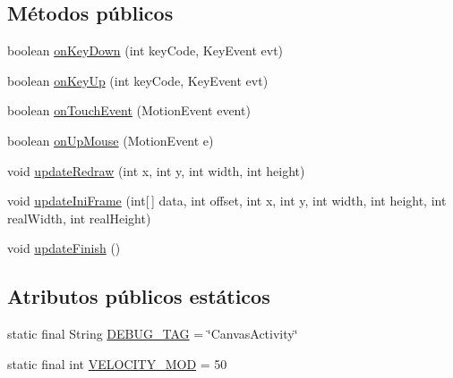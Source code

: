 \subsection*{Métodos públicos}
\begin{DoxyCompactItemize}
\item 
boolean \hyperlink{classes_1_1ucm_1_1tfg_1_1controlremotolinux_1_1client_1_1controller_1_1CanvasActivity_a16ecf145718bb0bcaf12974329d1170e}{on\-Key\-Down} (int key\-Code, Key\-Event evt)
\item 
boolean \hyperlink{classes_1_1ucm_1_1tfg_1_1controlremotolinux_1_1client_1_1controller_1_1CanvasActivity_a48d761e87c01fb342d7955d6a419b17a}{on\-Key\-Up} (int key\-Code, Key\-Event evt)
\item 
boolean \hyperlink{classes_1_1ucm_1_1tfg_1_1controlremotolinux_1_1client_1_1controller_1_1CanvasActivity_aeb5475156c552b45b123631ffe38e4f3}{on\-Touch\-Event} (Motion\-Event event)
\item 
boolean \hyperlink{classes_1_1ucm_1_1tfg_1_1controlremotolinux_1_1client_1_1controller_1_1CanvasActivity_aabf81736f09591b50dd7631e2e53123e}{on\-Up\-Mouse} (Motion\-Event e)
\item 
void \hyperlink{classes_1_1ucm_1_1tfg_1_1controlremotolinux_1_1client_1_1controller_1_1CanvasActivity_af5b910f066c7052f9d7f94670763fe48}{update\-Redraw} (int x, int y, int width, int height)
\item 
void \hyperlink{classes_1_1ucm_1_1tfg_1_1controlremotolinux_1_1client_1_1controller_1_1CanvasActivity_a8a3ee414f2dd6f2059017fa9c7d8e648}{update\-Ini\-Frame} (int\mbox{[}$\,$\mbox{]} data, int offset, int x, int y, int width, int height, int real\-Width, int real\-Height)
\item 
void \hyperlink{classes_1_1ucm_1_1tfg_1_1controlremotolinux_1_1client_1_1controller_1_1CanvasActivity_af38507eafb0adc47dd2c96bc546c69b0}{update\-Finish} ()
\end{DoxyCompactItemize}
\subsection*{Atributos públicos estáticos}
\begin{DoxyCompactItemize}
\item 
static final String \hyperlink{classes_1_1ucm_1_1tfg_1_1controlremotolinux_1_1client_1_1controller_1_1CanvasActivity_a6eb4ed0771188a692df57ceca3fb5f7e}{D\-E\-B\-U\-G\-\_\-\-T\-A\-G} = \char`\"{}Canvas\-Activity\char`\"{}
\item 
static final int \hyperlink{classes_1_1ucm_1_1tfg_1_1controlremotolinux_1_1client_1_1controller_1_1CanvasActivity_a646d0e209d35564cdc42d837671bd7a4}{V\-E\-L\-O\-C\-I\-T\-Y\-\_\-\-M\-O\-D} = 50
\end{DoxyCompactItemize}
